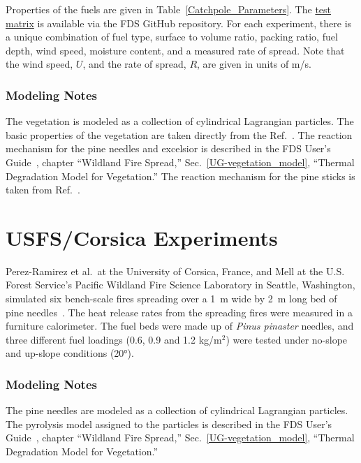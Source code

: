 Properties of the fuels are given in Table~\ref{Catchpole_Parameters}. The \href{https://github.com/firemodels/fds/blob/master/Validation/USFS_Catchpole/FDS_Input_Files/Test_Matrix.csv}{test matrix} is available via the FDS GitHub repository. For each experiment, there is a unique combination of fuel type, surface to volume ratio, packing ratio, fuel depth, wind speed, moisture content, and a measured rate of spread. Note that the wind speed, $U$, and the rate of spread, $R$, are given in units of m/s.

\subsubsection{Modeling Notes}

The vegetation is modeled as a collection of cylindrical Lagrangian particles. The basic properties of the vegetation are taken directly from the Ref.~\cite{Catchpole:CST1998}. The reaction mechanism for the pine needles and excelsior is described in the FDS User's Guide~\cite{FDS_Users_Guide}, chapter ``Wildland Fire Spread,'' Sec.~\ref{UG-vegetation_model}, ``Thermal Degradation Model for Vegetation.'' The reaction mechanism for the pine sticks is taken from Ref.~\cite{Rinta-Paavola:2023}.


\section{USFS/Corsica Experiments}
\label{USFS_Corsica_Description}

Perez-Ramirez et al.~at the University of Corsica, France, and Mell at the U.S. Forest Service's Pacific Wildland Fire Science Laboratory in Seattle, Washington, simulated six bench-scale fires spreading over a 1~m wide by 2~m long bed of pine needles~\cite{Perez-Ramirez:FT2017}. The heat release rates from the spreading fires were measured in a furniture calorimeter. The fuel beds were made up of {\em Pinus pinaster} needles, and three different fuel loadings (0.6, 0.9 and 1.2 kg/m$^2$) were tested under no-slope and up-slope conditions (20\unit{\degree}).

\subsubsection{Modeling Notes}

The pine needles are modeled as a collection of cylindrical Lagrangian particles. The pyrolysis model assigned to the particles is described in the FDS User's Guide~\cite{FDS_Users_Guide}, chapter ``Wildland Fire Spread,'' Sec.~\ref{UG-vegetation_model}, ``Thermal Degradation Model for Vegetation.''

